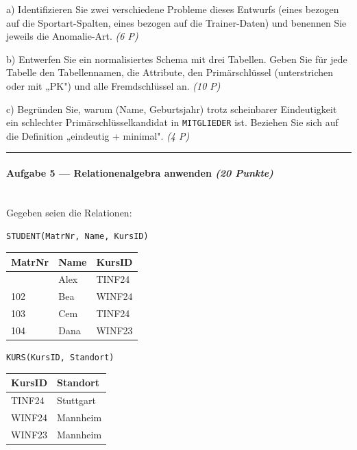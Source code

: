 \documentclass[11pt, a4paper]{article}
\begin{document}
a) Identifizieren Sie zwei verschiedene Probleme dieses Entwurfs (eines bezogen auf die Sportart-Spalten, eines bezogen auf die Trainer-Daten) und benennen Sie jeweils die Anomalie-Art. \textit{(6 P)}


b) Entwerfen Sie ein normalisiertes Schema mit drei Tabellen. Geben Sie für jede Tabelle den Tabellennamen, die Attribute, den Primärschlüssel (unterstrichen oder mit „PK") und alle Fremdschlüssel an. \textit{(10 P)}


c) Begründen Sie, warum (Name, Geburtsjahr) trotz scheinbarer Eindeutigkeit ein schlechter Primärschlüsselkandidat in \texttt{MITGLIEDER} ist. Beziehen Sie sich auf die Definition „eindeutig + minimal". \textit{(4 P)}



\noindent\textcolor{rulegray}{\rule{\linewidth}{0.4pt}}


\paragraph{Aufgabe 5 — Relationenalgebra anwenden \textit{(20 Punkte)}}\mbox{}\\[2pt]

Gegeben seien die Relationen:


\texttt{STUDENT(MatrNr, Name, KursID)}


{\small
\begin{tabularx}{\linewidth}{XXX}
\hline
\rowcolor{tableheadbg}
{\color{white}\textbf{MatrNr}} & {\color{white}\textbf{Name}} & {\color{white}\textbf{KursID}} \\[2pt]
\hline
\endhead
\hline
\endfoot
101 & Alex & TINF24 \\
102 & Bea & WINF24 \\
103 & Cem & TINF24 \\
104 & Dana & WINF23 \\
\end{tabularx}
}


\texttt{KURS(KursID, Standort)}


{\small
\begin{tabularx}{\linewidth}{XX}
\hline
\rowcolor{tableheadbg}
{\color{white}\textbf{KursID}} & {\color{white}\textbf{Standort}} \\[2pt]
\hline
\endhead
\hline
\endfoot
TINF24 & Stuttgart \\
WINF24 & Mannheim \\
WINF23 & Mannheim \\
\end{tabularx}
}
\end{document}
